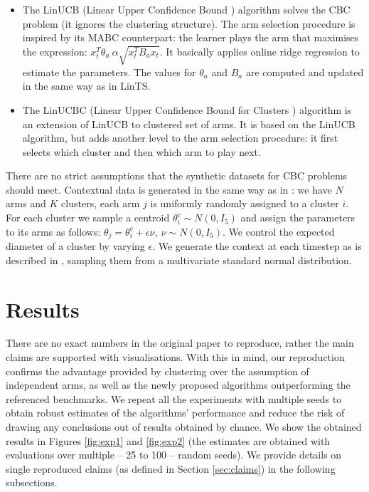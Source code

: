 \begin{itemize}
  \item The LinUCB (Linear Upper Confidence Bound \cite{li}) algorithm solves the CBC problem (it ignores the clustering structure). The arm selection procedure is inspired by its MABC counterpart: the learner plays the arm that maximises the expression: $x_t^T \theta_a \ \alpha \sqrt{x_t^T B_a x_t}$. It basically applies online ridge regression to estimate the parameters. The values for $\theta_a$ and $B_a$ are computed and updated in the same way as in LinTS. 
  \item The LinUCBC (Linear Upper Confidence Bound for Clusters \cite{bouneffouf}) algorithm is an extension of LinUCB to clustered set of arms. It is based on the LinUCB algorithm, but adds another level to the arm selection procedure: it first selects which cluster and then which arm to play next.
\end{itemize}

There are no strict assumptions that the synthetic datasets for CBC problems should meet. Contextual data is generated in the same way as in \cite{bouneffouf}: we have $N$ arms and $K$ clusters, each arm $j$ is uniformly randomly assigned to a cluster $i$. For each cluster we sample a centroid $\theta_i^c \sim N(0, I_5)$ and assign the parameters to its arms as follows: $\theta_j = \theta_i^c + \epsilon \nu,\ \nu \sim N(0, I_5)$. We control the expected diameter of a cluster by varying $\epsilon$. We generate the context at each timestep as is described in \cite{bouneffouf}, sampling them from a multivariate standard normal distribution.

\section{Results}
\label{sec:results}

There are no exact numbers in the original paper to reproduce, rather the main claims are supported with visualisations. With this in mind, our reproduction confirms the advantage provided by clustering over the assumption of independent arms, as well as the newly proposed algorithms outperforming the referenced benchmarks. We repeat all the experiments with multiple seeds to obtain robust estimates of the algorithms' performance and reduce the risk of drawing any conclusions out of results obtained by chance. We show the obtained results in Figures \ref{fig:exp1} and \ref{fig:exp2} (the estimates are obtained with evaluations over multiple -- 25 to 100 -- random seeds). We provide details on single reproduced claims (as defined in Section \ref{sec:claims}) in the following subsections.

